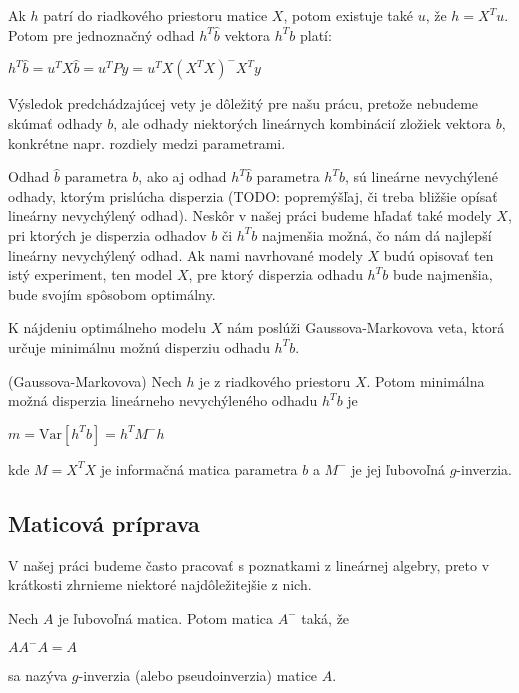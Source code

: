 Ak $h$ patrí do riadkového priestoru matice $X$, potom existuje také $u$, že $h = X^T u$.
Potom pre jednoznačný odhad $h^T \hat{b}$ vektora $h^T b$ platí:

\begin{center}
$h^T \hat{b} = u^T X \hat{b} = u^T P y = u^T X(X^T X)^- X^T y$
\end{center}

Výsledok predchádzajúcej vety je dôležitý pre našu prácu, pretože nebudeme skúmať odhady $b$,
ale odhady niektorých lineárnych kombinácií zložiek vektora $b$, 
konkrétne napr. rozdiely medzi parametrami.

Odhad $\hat{b}$ parametra $b$, ako aj odhad $h^T \hat{b}$ parametra $h^T b$, sú lineárne nevychýlené odhady,
ktorým prislúcha disperzia (TODO: popremýšľaj, či treba bližšie opísať lineárny nevychýlený odhad). 
Neskôr v našej práci budeme hľadať také modely $X$, pri ktorých je disperzia odhadov $b$ či $h^T b$ najmenšia možná,
čo nám dá najlepší lineárny nevychýlený odhad. 
Ak nami navrhované modely $X$ budú opisovať ten istý experiment, ten model $X$,
pre ktorý disperzia odhadu $h^T b$ bude najmenšia, bude svojím spôsobom optimálny.

K nájdeniu optimálneho modelu $X$ nám poslúži Gaussova-Markovova veta, 
ktorá určuje minimálnu možnú disperziu odhadu $h^T b$.

\begin{theorem}
\label{gauss-markov}
(Gaussova-Markovova) Nech $h$ je z riadkového priestoru $X$. 
Potom minimálna možná disperzia lineárneho nevychýleného odhadu $h^T b$ je

\begin{center}
$
m = \mathrm{Var}[h^T b] = h^T M^- h
$
\end{center}

kde $M = X^T X$ je informačná matica parametra $b$ a $M^-$ je jej ľubovoľná $g$-inverzia.
\end{theorem}

\subsection{Maticová príprava}

V našej práci budeme často pracovať s poznatkami z lineárnej algebry, preto v krátkosti zhrnieme niektoré najdôležitejšie z nich.

\begin{defin}
Nech $A$ je ľubovoľná matica. Potom matica $A^-$ taká, že
\begin{center}
$A A^- A = A$
\end{center}
sa nazýva $g$-inverzia (alebo pseudoinverzia) matice $A$.
\end{defin}

